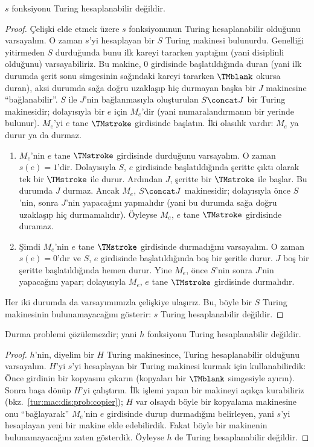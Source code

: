 \documentclass[../../../include/open-logic-section]{subfiles}
\begin{document}
\begin{lem}
$s$ fonksiyonu Turing hesaplanabilir değildir.
\end{lem}

\begin{proof}
Çelişki elde etmek üzere $s$ fonksiyonunun Turing hesaplanabilir olduğunu
varsayalım. O zaman $s$'yi hesaplayan bir $S$ Turing makinesi bulunurdu.
Genelliği yitirmeden $S$ durduğunda bunu ilk kareyi tararken yaptığını (yani
disiplinli olduğunu) varsayabiliriz. Bu makine, $0$ girdisinde
başlatıldığında duran (yani ilk durumda şerit sonu simgesinin sağındaki kareyi
tararken $\TMblank$ okursa duran), aksi durumda sağa doğru uzaklaşıp hiç
durmayan başka bir $J$ makinesine ``bağlanabilir''. $S$ ile $J$'nin
bağlanmasıyla oluşturulan $S\concat J$ bir Turing makinesidir; dolayısıyla
bir $e$ için $M_e$'dir (yani numaralandırmanın bir yerinde bulunur). $M_e$'yi
$e$ tane $\TMstroke$ girdisinde başlatın. İki olasılık vardır: $M_e$ ya durur
ya da durmaz.
\begin{enumerate}
\item $M_e$'nin $e$ tane $\TMstroke$ girdisinde durduğunu varsayalım. O zaman
  $s(e)=1$'dir. Dolayısıyla $S$, $e$ girdisinde başlatıldığında şeritte çıktı
  olarak tek bir $\TMstroke$ ile durur. Ardından $J$, şeritte bir
  $\TMstroke$ ile başlar. Bu durumda $J$ durmaz. Ancak $M_e$, $S\concat J$
  makinesidir; dolayısıyla önce $S$'nin, sonra $J$'nin yapacağını yapmalıdır
  (yani bu durumda sağa doğru uzaklaşıp hiç durmamalıdır). Öyleyse $M_e$,
  $e$ tane $\TMstroke$ girdisinde duramaz.

\item Şimdi $M_e$'nin $e$ tane $\TMstroke$ girdisinde durmadığını
  varsayalım. O zaman $s(e)=0$'dır ve $S$, $e$ girdisinde başlatıldığında boş
  bir şeritle durur. $J$ boş bir şeritte başlatıldığında hemen durur. Yine
  $M_e$, önce $S$'nin sonra $J$'nin yapacağını yapar; dolayısıyla $M_e$, $e$
  tane $\TMstroke$ girdisinde durmalıdır.
\end{enumerate}
Her iki durumda da varsayımımızla çelişkiye ulaşırız. Bu, böyle bir $S$
Turing makinesinin bulunamayacağını gösterir: $s$ Turing hesaplanabilir
değildir.
\end{proof}

\begin{thm}
 Durma problemi çözülemezdir; yani $h$ fonksiyonu
Turing hesaplanabilir değildir.
\end{thm}

\begin{proof}
$h$'nin, diyelim bir $H$ Turing makinesince, Turing hesaplanabilir olduğunu
varsayalım. $H$'yi $s$'yi hesaplayan bir Turing makinesi kurmak için
kullanabilirdik: Önce girdinin bir kopyasını çıkarın (kopyaları bir
$\TMblank$ simgesiyle ayırın). Sonra başa dönüp $H$'yi çalıştırın. İlk işlemi
yapan bir makineyi açıkça kurabiliriz (bkz.~\cref{tur:mac:dis:prob:copier});
$H$ var olsaydı böyle bir kopyalama makinesine onu ``bağlayarak'' $M_e$'nin
$e$ girdisinde durup durmadığını belirleyen, yani $s$'yi hesaplayan yeni bir
makine elde edebilirdik. Fakat böyle bir makinenin bulunamayacağını zaten
gösterdik. Öyleyse $h$ de Turing hesaplanabilir değildir.
\end{proof}
\end{document}
